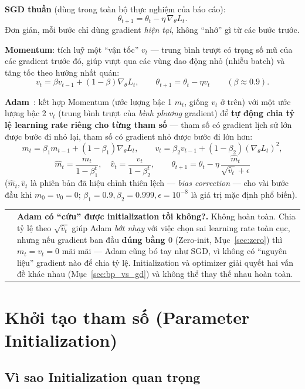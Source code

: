 \documentclass[12pt,a4paper]{report}
\makeatletter
\newenvironment{tructiep}[1][Cách hiểu đơn giản]
  {\par\smallskip\noindent\begin{tabular}{@{}p{0.35em}@{\hspace{6pt}}p{\dimexpr\linewidth-1.9em\relax}@{}}
   \textcolor{boxln}{\rule{2pt}{\baselineskip}} & \textbf{#1.}\enspace\ignorespaces}
  {\end{tabular}\par\smallskip}
\newcommand{\en}[1]{\textit{#1}}
\makeatother
\begin{document}
\textbf{SGD thuần} (dùng trong toàn bộ thực nghiệm của báo cáo):
$$\theta_{t+1} = \theta_t - \eta\,\nabla_\theta L_t.$$
Đơn giản, mỗi bước chỉ dùng gradient \emph{hiện tại}, không ``nhớ'' gì từ
các bước trước.

\textbf{Momentum}: tích luỹ một ``vận tốc'' $v_t$ --- trung bình trượt có
trọng số mũ của các gradient trước đó, giúp vượt qua các vùng dao động
nhỏ (nhiễu batch) và tăng tốc theo hướng nhất quán:
$$v_t = \beta v_{t-1} + (1-\beta)\nabla_\theta L_t, \qquad \theta_{t+1} = \theta_t - \eta v_t \qquad (\beta\approx0.9).$$

\textbf{Adam}~\citep{kingma2015adam}: kết hợp Momentum (ước lượng bậc 1
$m_t$, giống $v_t$ ở trên) với một ước lượng bậc 2 $v_t$ (trung bình trượt
của \emph{bình phương} gradient) để \textbf{tự động chia tỷ lệ learning
rate riêng cho từng tham số} --- tham số có gradient lịch sử lớn được
bước đi nhỏ lại, tham số có gradient nhỏ được bước đi lớn hơn:
$$m_t=\beta_1 m_{t-1}+(1-\beta_1)\nabla_\theta L_t,\qquad
v_t=\beta_2 v_{t-1}+(1-\beta_2)(\nabla_\theta L_t)^2,$$
$$\hat m_t = \frac{m_t}{1-\beta_1^t},\quad \hat v_t=\frac{v_t}{1-\beta_2^t},\qquad
\theta_{t+1}=\theta_t-\eta\,\frac{\hat m_t}{\sqrt{\hat v_t}+\epsilon}$$
($\hat m_t,\hat v_t$ là phiên bản đã hiệu chỉnh thiên lệch --- \en{bias
correction} --- cho vài bước đầu khi $m_0=v_0=0$; $\beta_1{=}0.9,
\beta_2{=}0.999,\epsilon{=}10^{-8}$ là giá trị mặc định phổ biến).

\begin{tructiep}[Adam có ``cứu'' được initialization tồi không?]
Không hoàn toàn. Chia tỷ lệ theo $\sqrt{\hat v_t}$ giúp Adam \emph{bớt
nhạy} với việc chọn sai learning rate toàn cục, nhưng nếu gradient ban đầu
\textbf{đúng bằng $0$} (Zero-init, Mục~\ref{sec:zero}) thì $m_t=v_t=0$
mãi mãi --- Adam cũng bó tay như SGD, vì không có ``nguyên liệu'' gradient
nào để chia tỷ lệ. Initialization và optimizer giải quyết hai vấn đề khác
nhau (Mục~\ref{sec:bp_vs_gd}) và không thể thay thế nhau hoàn toàn.
\end{tructiep}

\section{Khởi tạo tham số (Parameter Initialization)}
\label{sec:init}

\subsection{Vì sao Initialization quan trọng}
\end{document}

